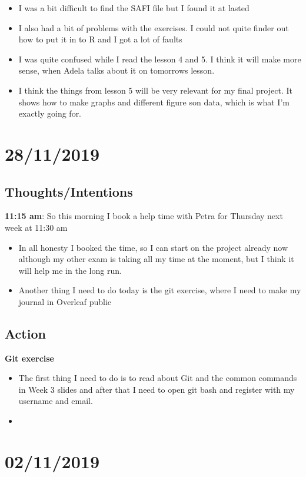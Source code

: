 \documentclass{article}
\begin{document}
\begin{itemize}
    \item I was a bit difficult to find the SAFI file but I found it at lasted 
    \item I also had a bit of problems with the exercises. I could not quite finder out how to put it in to R and I got a lot of faults 
    \item I was quite confused while I read the lesson 4 and 5. I think it will make more sense, when Adela talks about it on tomorrows lesson. 
    \item I think the things from lesson 5 will be very relevant for my final project. It shows how to make graphs and different figure son data, which is what I'm exactly going for. 
\end{itemize}\bigskip


\section{28/11/2019}
\subsection{Thoughts/Intentions}
\textbf{11:15 am}:  So this morning I book a help time with Petra for Thursday next week at 11:30 am 
\begin{itemize}
    \item In all honesty I booked the time, so I can start on the project already now although my other exam is taking all my time at the moment, but I think it will help me in the long run.
    \item Another thing I need to do today is the git exercise, where I need to make my journal in Overleaf public 
\end{itemize}

\subsection{Action}
\textbf{Git exercise}
\begin{itemize}
    \item The first thing I need to do is to read about Git and the common commands in Week 3 slides and after that I need to open git bash and register with my username and email. 
    \item 
\end{itemize}


\section{02/11/2019}
\end{document}
